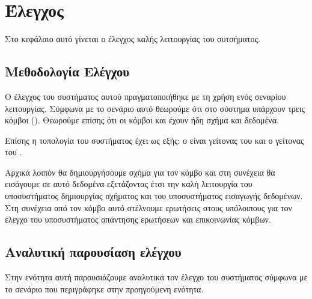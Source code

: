 \chapter{Έλεγχος}
Στο κεφάλαιο αυτό γίνεται ο έλεγχος καλής λειτουργίας του
συτσήματος.

\section{Μεθοδολογία Ελέγχου}
Ο έλεγχος του συστήματος αυτού πραγματοποιήθηκε με τη χρήση ενός
σεναρίου λειτουργίας. Σύμφωνα με το σενάριο αυτό θεωρούμε ότι στο
σύστημα υπάρχουν τρεις κόμβοι (). Θεωρούμε
επίσης ότι οι κόμβοι  και  έχουν ήδη σχήμα και
δεδομένα. 

Επίσης η τοπολογία του συστήματος έχει ως εξής: ο  είναι
γείτονας του  και ο  γείτονας του .

Αρχικά λοιπόν θα δημιουργήσουμε σχήμα για τον κόμβο  και
στη συνέχεια θα εισάγουμε σε αυτό δεδομένα εξετάζοντας έτσι την
καλή λειτουργία του υποσυστήματος δημιουργίας σχήματος και του
υποσυστήματος εισαγωγής δεδομένων. Στη συνέχεια από τον κόμβο αυτό
στέλνουμε ερωτήσεις στους υπόλοιπους για τον έλεγχο του
υποσυστήματος απάντησης ερωτήσεων και επικοινωνίας κόμβων.

\section{Αναλυτική παρουσίαση ελέγχου}
Στην ενότητα αυτή παρουσιάζουμε αναλυτικά τον έλεγχο του
συστήματος σύμφωνα με το σενάριο που περιγράφηκε στην προηγούμενη
ενότητα.

